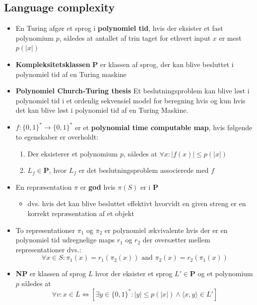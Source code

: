 \subsection{Language complexity}
\begin{itemize}
  \item En Turing afgør et sprog i \textbf{polynomiel tid}, hvis der eksister et fast polynomium $p$, således at antallet af trin taget for ethvert input $x$ er mest $p(|x|)$  
	\item \textbf{Kompleksitetsklassen} $\mathbf P$ er klassen af sprog, der kan blive besluttet i polynomiel tid af en Turing maskine
  \item \textbf{Polynomiel Church-Turing thesis} Et beslutningsproblem kan blive løst i polynomiel tid i et ordenlig sekvensiel model for beregning hvis og kun hvis det kan blive løst i polynomiel tid af en Turing Maskine.
  \item $f:\{0,1\}^* \rightarrow \{0,1\}^*$ er et \textbf{polynomial time computable map}, hvis følgende to egenskaber er overholdt:
  \begin{enumerate}
  	\item Der eksisterer et polynomium $p$, således at $\forall x : |f(x)| \leq p(|x|)$
    \item $L_f \in \mathbf P$, hvor $L_f$ er det beslutningsproblem associerede med $f$
  \end{enumerate}
  \item En repræsentation $\pi$ er \textbf{god} hvis $\pi(S)$ er i $\mathbf P$ 
  \begin{itemize}
  	\item dvs. hvis det kan blive besluttet effektivt hvorvidt en given streng er en korrekt repræsentation af et objekt
  \end{itemize}
  \item To representationer $\pi_1$ og $\pi_2$ er polynomiel ækvivalente hvis der er en polynomiel tid udregnelige maps $r_1$ og $r_2$ der oversætter mellem representationer dvs.:
  \begin{equation*}
    \forall x \in S: \pi_1(x) = r_1(\pi_2(x)) \text{ and } \pi_2 (x) = r_2(\pi_1(x))
  \end{equation*}
	\item \textbf{NP} er klassen af sprog $L$ hvor der eksister et sprog $L' \in \mathbf P$ og et polynomium $p$ således at
  \begin{equation*}
    \forall v: x \in L \Leftrightarrow [\exists y \in \{0,1\}^* : |y| \leq p(|x|) \land \langle x, y \rangle \in L']

\end{equation*}
\end{itemize}
